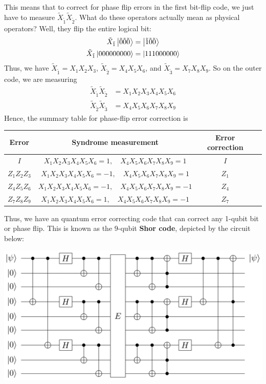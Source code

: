 This means that to correct for phase flip errors in the first bit-flip code, we just have to measure $\tilde{X}_{\tilde{1}}\tilde{X}_{\tilde{2}}$. What do these operators actually mean as physical operators? Well, they flip the entire logical bit:
\begin{align*}
    \tilde{X}_{\tilde{1}} \ket{\tilde{0} \tilde{0} \tilde{0}} &= \ket{\tilde{1} \tilde{0} \tilde{0}} \\
    \tilde{X}_{\tilde{1}} \ket{000000000} &= \ket{111000000}
\end{align*}
Thus, we have $\tilde{X}_{\tilde{1}} = X_1 X_2 X_3$, $\tilde{X}_{\tilde{2}} = X_4 X_5 X_6$, and $\tilde{X}_{\tilde{3}} = X_7 X_8 X_9$.
So on the outer code, we are measuring
\begin{align*}
    \tilde{X}_{\tilde{1}}\tilde{X}_{\tilde{2}} &= X_1 X_2 X_3 X_4 X_5 X_6 \\
    \tilde{X}_{\tilde{2}}\tilde{X}_{\tilde{3}} &= X_4 X_5 X_6 X_7 X_8 X_9
\end{align*}
Hence, the summary table for phase-flip error correction is 
\begin{center}
    \begin{tabular}{ | c | c | c | c | }
        Error & Syndrome measurement & Error correction \\ \hline
        $I$ & $X_1 X_2 X_3 X_4 X_5 X_6 = 1, \quad X_4 X_5 X_6 X_7 X_8 X_9 = 1$ & $I$ \\ 
        $Z_1Z_2Z_3$ & $X_1 X_2 X_3 X_4 X_5 X_6 = -1, \quad X_4 X_5 X_6 X_7 X_8 X_9 = 1$ & $Z_1$ \\
        $Z_4Z_5Z_6$ & $X_1 X_2 X_3 X_4 X_5 X_6 = -1, \quad X_4 X_5 X_6 X_7 X_8 X_9 = -1$ & $Z_4$ \\
        $Z_7Z_8Z_9$ & $X_1 X_2 X_3 X_4 X_5 X_6 = 1, \quad X_4 X_5 X_6 X_7 X_8 X_9 = -1$ & $Z_7$ \\
\end{tabular}
\end{center}
Thus, we have an quantum error correcting code that
can correct any 1-qubit bit or phase flip. This is known as the $9$-qubit \textbf{Shor code}, depicted by the circuit below:
\begin{center}
\includegraphics[width=\textwidth*2/3]{../images/lec15_shor.png} 
\end{center}
